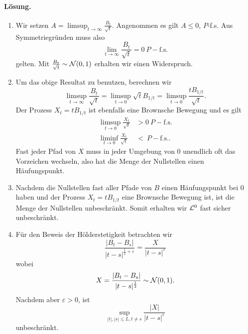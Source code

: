 \paragraph*{Lösung.} 
\begin{enumerate}
    \item Wir setzen $A=\limsup_{t\to \infty} \frac{B_t}{\sqrt{t}}$. Angenommen
        es gilt $A\leq 0$, $P$-f.s. Aus Symmetriegründen muss also
        \begin{equation*}
            \lim_{t\to\infty} \frac{B_t}{\sqrt{t}} = 0 \ P-\text{f.s.}
        \end{equation*}
        gelten. Mit $\frac{B_t}{\sqrt{t}}\sim \mathcal N(0,1)$ erhalten wir einen Widerspruch.
    \item Um das obige Resultat zu benutzen, berechnen wir
        \begin{equation*}
            \limsup_{t\to\infty} \frac{B_t}{\sqrt{t}} = 
            \limsup_{t\to 0} \sqrt{t} B_{1/t} = 
            \limsup_{t\to 0} \frac{t B_{1/t}}{\sqrt{t}}. 
        \end{equation*}
        Der Prozess $X_t = t B_{1/t}$ ist ebenfalls eine Brownsche Bewegung und
        es gilt
        \begin{align*}
            \limsup_{t\to 0} \frac{X_t}{\sqrt{t}} & > 0 \ P-\text{f.s.} \\
            \liminf_{t\to 0} \frac{X_t}{\sqrt{t}} & < \ P-\text{f.s.}.
        \end{align*}
        Fast jeder Pfad von $X$ muss in jeder Umgebung von $0$ unendlich oft
        das Vorzeichen wechseln, also hat die Menge der Nullstellen einen
        Häufungspunkt. 
    \item Nachdem die Nullstellen fast aller Pfade von $B$ einen Häufungspunkt bei
        $0$ haben und der Prozess $X_t = t B_{1/t}$ eine Brownsche Bewegung ist,
        ist die Menge der Nullstellen unbeschränkt. Somit erhalten wir 
        $\mathcal L^{0}$ fast sicher unbeschränkt. 
    \item Für den Beweis der Hölderstetigkeit betrachten wir
        \begin{equation*}
            \frac{| B_t - B_s|}{ |t-s|^{\frac{1}{2}+\varepsilon} } = 
            \frac{X}{|t-s|^{\varepsilon}}
        \end{equation*}
        wobei
        \begin{equation*}
            X = \frac{| B_t - B_s|}{ |t-s|^{\frac{1}{2}}} \sim \mathcal N(0,1).
        \end{equation*}
        Nachdem aber $\varepsilon>0$, ist
        \begin{equation*}
            \sup_{|t|,|s| \leq L, t\neq s} \frac{|X|}{|t-s|^{\varepsilon}}
        \end{equation*}
        unbeschränkt. 
\end{enumerate}



